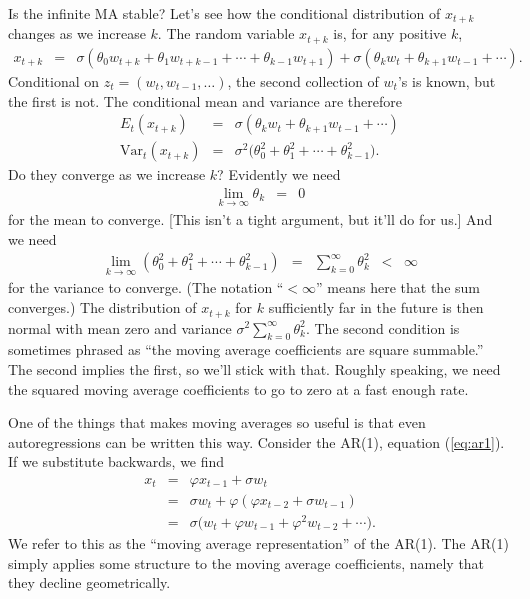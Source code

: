 \documentclass[11pt]{article}
\begin{document}
Is the infinite MA stable?
Let's see how the conditional distribution of $x_{t+k}$ changes as we increase $k$.
The random variable $x_{t+k}$ is, for any positive $k$,
\begin{eqnarray*}
    x_{t+k} &=& \sigma
        \left(\theta_0 w_{t+k} + \theta_1 w_{t+k-1} + \cdots + \theta_{k-1} w_{t+1}  \right)
            + \sigma \left( \theta_k w_{t} + \theta_{k+1} w_{t-1} + \cdots \right) .
\end{eqnarray*}
Conditional on $ z_{t} = (w_t, w_{t-1}, \ldots)$,
the second collection of $w_t$'s is known, but the first is not.
The conditional mean and variance are therefore
\begin{eqnarray*}
    E_t \left( x_{t+k} \right) &=&
        \sigma \left( \theta_k w_t + \theta_{k+1} w_{t-1} + \cdots \right) \\
    \mbox{Var}_t \left( x_{t+k} \right)
            &=& \sigma^2 \big( \theta_0^2 + \theta_1^2 + \cdots + \theta_{k-1}^2 \big).
\end{eqnarray*}
Do they converge as we increase $k$?
Evidently we need
\begin{eqnarray*}
    \lim_{k\rightarrow \infty} \theta_k &=& 0
\end{eqnarray*}
for the mean to converge.
[This isn't a tight argument, but it'll do for us.]
And we need
\begin{eqnarray*}
    \lim_{k\rightarrow \infty} (\theta_0^2 + \theta_1^2 + \cdots + \theta_{k-1}^2) &=&
            \sum_{k=0}^\infty \theta_k^2 \;\;<\;\; \infty
\end{eqnarray*}
for the variance to converge.
(The notation ``$< \infty$'' means here that the sum converges.)
The distribution of $x_{t+k}$ for $k$ sufficiently far in the future
is then normal with mean zero and variance $\sigma^2 \sum_{k=0}^\infty \theta_k^2 $.
The second condition is sometimes phrased as ``the moving average coefficients
are square summable.''
The second implies the first, so we'll stick with that.
Roughly speaking, we need the squared moving average coefficients to
go to zero at a fast enough rate.

One of the things that makes moving averages so useful is that even
autoregressions can be written this way.
Consider the AR(1), equation (\ref{eq:ar1}).
If we substitute backwards, we find
\begin{eqnarray*}
    x_{t} &=& \varphi x_{t-1} + \sigma w_t \\
            &=& \sigma w_t + \varphi \left( \varphi x_{t-2} + \sigma w_{t-1} \right) \\
            &=& \sigma \big( w_t + \varphi w_{t-1} + \varphi^2 w_{t-2} + \cdots \big) .
\end{eqnarray*}
We refer to this as the ``moving average representation'' of the AR(1).
The AR(1) simply applies some structure to the moving average coefficients,
namely that they decline geometrically.
\end{document}
